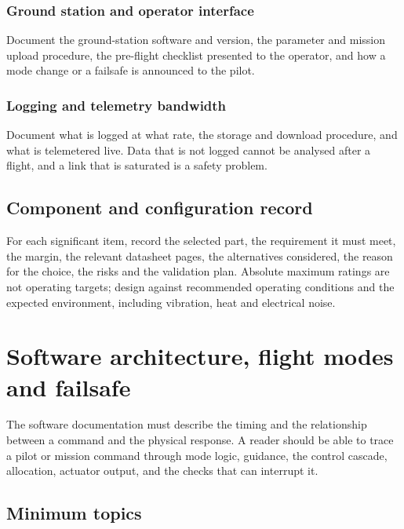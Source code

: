 \documentclass[11pt,a4paper]{article}
\begin{document}
\subsubsection{Ground station and operator interface}
Document the ground-station software and version, the parameter and mission
upload procedure, the pre-flight checklist presented to the operator, and how a
mode change or a failsafe is announced to the pilot.

\subsubsection{Logging and telemetry bandwidth}
Document what is logged at what rate, the storage and download procedure, and
what is telemetered live. Data that is not logged cannot be analysed after a
flight, and a link that is saturated is a safety problem.

\subsection{Component and configuration record}

For each significant item, record the selected part, the requirement it must
meet, the margin, the relevant datasheet pages, the alternatives considered,
the reason for the choice, the risks and the validation plan. Absolute maximum
ratings are not operating targets; design against recommended operating
conditions and the expected environment, including vibration, heat and
electrical noise.

\section{Software architecture, flight modes and failsafe}

The software documentation must describe the timing and the relationship
between a command and the physical response. A reader should be able to trace a
pilot or mission command through mode logic, guidance, the control cascade,
allocation, actuator output, and the checks that can interrupt it.

\subsection{Minimum topics}
\end{document}
